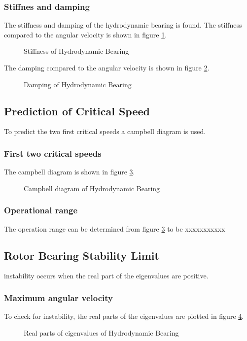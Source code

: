 \subsubsection{Stiffnes and damping}
The stiffness and damping of the hydrodynamic bearing is found. The stiffness compared to the angular velocity is shown in figure \ref{fig:hydrodynamic_bearing_stiffness}.
\begin{figure}[htbp]
    \centering
    
    \caption{Stiffness of Hydrodynamic Bearing}
    \label{fig:hydrodynamic_bearing_stiffness}
\end{figure}
The damping compared to the angular velocity is shown in figure \ref{fig:hydrodynamic_bearing_damping}.
\begin{figure}[htbp]
    \centering
    
    \caption{Damping of Hydrodynamic Bearing}
    \label{fig:hydrodynamic_bearing_damping}
\end{figure}

\subsection{Prediction of Critical Speed}
To predict the two first critical speeds a campbell diagram is used.

\subsubsection{First two critical speeds}
The campbell diagram is shown in figure \ref{fig:hydrodynamic_bearing_campbell}.
\begin{figure}[htbp]
    \centering
    
    \caption{Campbell diagram of Hydrodynamic Bearing}
    \label{fig:hydrodynamic_bearing_campbell}
\end{figure}


\subsubsection{Operational range}
The operation range can be determined from figure \ref{fig:hydrodynamic_bearing_campbell} to be xxxxxxxxxxx

\subsection{Rotor Bearing Stability Limit}
instability occurs when the real part of the eigenvalues are positive. 

\subsubsection{Maximum angular velocity}
To check for instability, the real parts of the eigenvalues are plotted in figure \ref{fig:hydrodynamic_bearing_eigenvalues}.
\begin{figure}[htbp]
    \centering
    
    \caption{Real parts of eigenvalues of Hydrodynamic Bearing}
    \label{fig:hydrodynamic_bearing_eigenvalues}
\end{figure}

